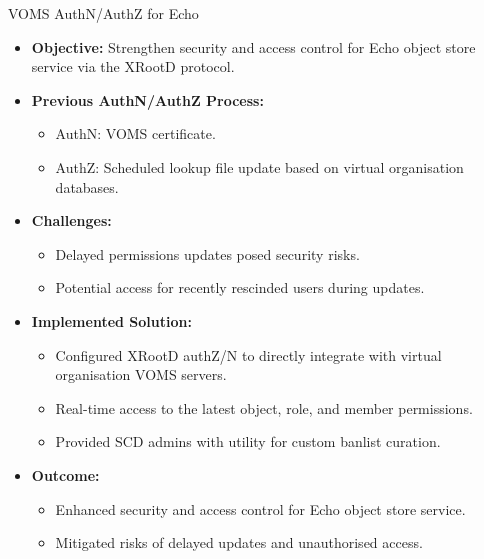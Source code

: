 \documentclass[10pt]{beamer}
\begin{document}
  \begin{frame}{VOMS AuthN/AuthZ for Echo}
    \begin{itemize}
      \item \textbf{Objective:} Strengthen security and access control for
      Echo object store service via the XRootD protocol.
  
      \item \textbf{Previous AuthN/AuthZ Process:}
        \begin{itemize}
          \item AuthN: VOMS certificate.
          \item AuthZ: Scheduled lookup file update based on virtual organisation
          databases.
        \end{itemize}
  
      \item \textbf{Challenges:}
        \begin{itemize}
          \item Delayed permissions updates posed security risks.
          \item Potential access for recently rescinded users during updates.
        \end{itemize}
  
      \item \textbf{Implemented Solution:}
        \begin{itemize}
          \item Configured XRootD authZ/N to directly integrate with virtual
          organisation VOMS servers.
          \item Real-time access to the latest object, role, and member permissions.
          \item Provided SCD admins with utility for custom banlist curation.
        \end{itemize}
  
      \item \textbf{Outcome:}
        \begin{itemize}
          \item Enhanced security and access control for Echo object store service.
          \item Mitigated risks of delayed updates and unauthorised access.
        \end{itemize}
    \end{itemize}
  \end{frame}
\end{document}
